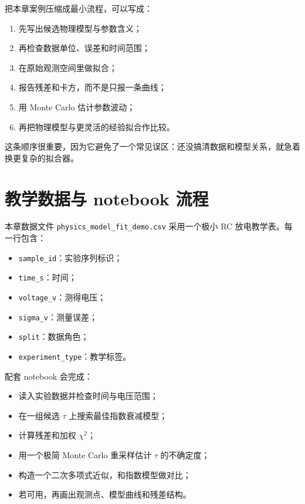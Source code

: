把本章案例压缩成最小流程，可以写成：

\begin{enumerate}
    \item 先写出候选物理模型与参数含义；
    \item 再检查数据单位、误差和时间范围；
    \item 在原始观测空间里做拟合；
    \item 报告残差和卡方，而不是只报一条曲线；
    \item 用 Monte Carlo 估计参数波动；
    \item 再把物理模型与更灵活的经验拟合作比较。
\end{enumerate}

这条顺序很重要，因为它避免了一个常见误区：还没搞清数据和模型关系，就急着换更复杂的拟合器。

\section{教学数据与 notebook 流程}

本章数据文件 \nolinkurl{physics_model_fit_demo.csv} 采用一个极小 RC 放电教学表。每一行包含：

\begin{itemize}
    \item \texttt{sample\_id}：实验序列标识；
    \item \texttt{time\_s}：时间；
    \item \texttt{voltage\_v}：测得电压；
    \item \texttt{sigma\_v}：测量误差；
    \item \texttt{split}：数据角色；
    \item \texttt{experiment\_type}：教学标签。
\end{itemize}

配套 notebook 会完成：

\begin{itemize}
    \item 读入实验数据并检查时间与电压范围；
    \item 在一组候选 $\tau$ 上搜索最佳指数衰减模型；
    \item 计算残差和加权 $\chi^2$；
    \item 用一个极简 Monte Carlo 重采样估计 $\tau$ 的不确定度；
    \item 构造一个二次多项式近似，和指数模型做对比；
    \item 若可用，再画出观测点、模型曲线和残差结构。
\end{itemize}

